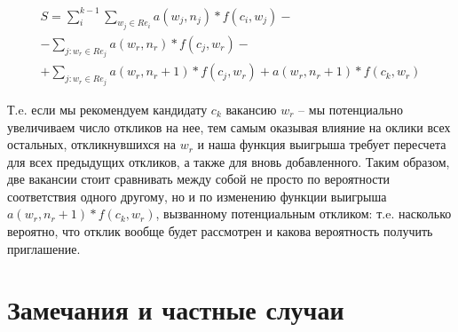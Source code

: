 \documentclass[twocolumn]{article}
\begin{document}
    \begin{multline}
        \label{last_sum}
        S = \sum_{i}^{k-1}\sum_{w_j \in Re_{i}} a(w_j, n_j)  * f(c_i, w_j)  - \\
        - \sum_{j : w_r \in Re_{j}} a(w_r, n_r)  * f(c_j, w_r) - \\
        + \sum_{j : w_r \in Re_{j}} a(w_r, n_r + 1)  * f(c_j, w_r)
        + a(w_r, n_r + 1)  * f(c_k, w_r)
    \end{multline}

    Т.e. если мы рекомендуем кандидату $c_k$ вакансию $w_r$ -- мы потенциально увеличиваем число откликов на нее, тем самым оказывая влияние на оклики всех остальных, откликнувшихся на $w_r$ и наша функция выигрыша требует пересчета для всех предыдущих откликов, а также для вновь добавленного. Таким образом, две вакансии стоит сравнивать между собой не просто по вероятности соответствия одного другому, но и по изменению функции выигрыша $a(w_r, n_r + 1)  * f(c_k, w_r)$, вызванному потенциальным откликом: т.e. насколько вероятно, что отклик вообще будет рассмотрен и какова вероятность получить приглашение.

    \section{Замечания и частные случаи}
\end{document}
